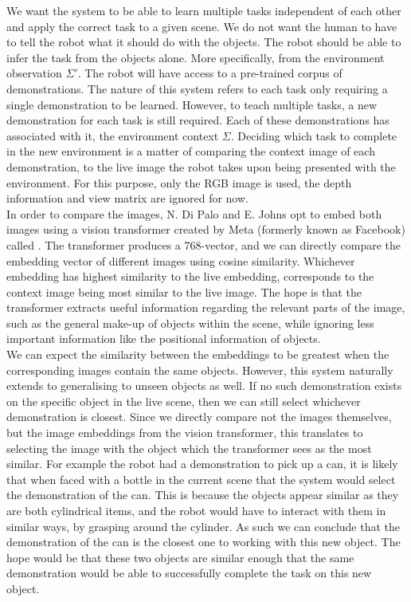 We want the system to be able to learn multiple tasks independent of each other and apply the correct task to a given scene. We do not want the human to have to tell the robot what it should do with the objects. The robot should be able to infer the task from the objects alone. More specifically, from the environment observation $\Sigma'$.
The robot will have access to a pre-trained corpus of demonstrations. The  nature of this system refers to each task only requiring a single demonstration to be learned. However, to teach multiple tasks, a new demonstration for each task is still required. Each of these demonstrations has associated with it, the environment context $\Sigma$. Deciding which task to complete in the new environment is a matter of comparing the context image of each demonstration, to the live image the robot takes upon being presented with the environment. For this purpose, only the RGB image is used, the depth information and view matrix are ignored for now.\\

In order to compare the images, N. Di Palo and E. Johns opt to embed both images using a vision transformer created by Meta (formerly known as Facebook) called  \cite{dino-paper}. The transformer produces a 768-vector, and we can directly compare the embedding vector of different images using cosine similarity. Whichever embedding has highest similarity to the live embedding, corresponds to the context image being most similar to the live image. The hope is that the transformer extracts useful information regarding the relevant parts of the image, such as the general make-up of objects within the scene, while ignoring less important information like the positional information of objects.\\

We can expect the similarity between the embeddings to be greatest when the corresponding images contain the same objects. However, this system naturally extends to generalising to unseen objects as well. If no such demonstration exists on the specific object in the live scene, then we can still select whichever demonstration is closest. Since we directly compare not the images themselves, but the image embeddings from the vision transformer, this translates to selecting the image with the object which the transformer sees as the most similar. For example the robot had a demonstration to pick up a can, it is likely that when faced with a bottle in the current scene that the system would select the demonstration of the can. This is because the objects appear similar as they are both cylindrical items, and the robot would have to interact with them in similar ways, by grasping around the cylinder. As such we can conclude that the demonstration of the can is the closest one to working with this new object. The hope would be that these two objects are similar enough that the same demonstration would be able to successfully complete the task on this new object.


